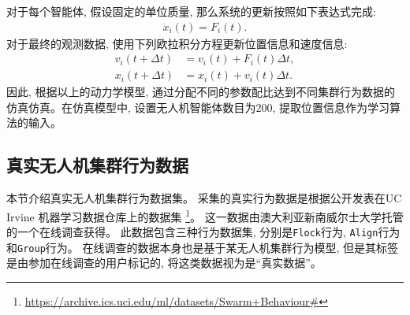 对于每个智能体, 假设固定的单位质量, 那么系统的更新按照如下表达式完成:
\begin{align}
\ddot{x}_{i}(t) = F_{i}(t).
\end{align}
对于最终的观测数据, 使用下列欧拉积分方程更新位置信息和速度信息:
\begin{align}
v_{i}(t + \Delta t) &= v_{i}(t) + F_{i}(t)\Delta t,\\
x_{i}(t + \Delta t) &= x_{i}(t) + v_{i}(t)\Delta t.  
\end{align}
因此, 根据以上的动力学模型, 通过分配不同的参数配比达到不同集群行为数据的仿真仿真。在仿真模型中, 设置无人机智能体数目为200, 提取位置信息作为学习算法的输入。 

\subsection{真实无人机集群行为数据}
\label{sec:truth-swarm}
本节介绍真实无人机集群行为数据集。 采集的真实行为数据是根据公开发表在UC Irvine 机器学习数据仓库上的数据集 \footnote{\url{https://archive.ics.uci.edu/ml/datasets/Swarm+Behaviour\#}}。 这一数据由澳大利亚新南威尔士大学托管的一个在线调查获得。 此数据包含三种行为数据集, 分别是\texttt{Flock}行为, \texttt{Align}行为和\texttt{Group}行为。 在线调查的数据本身也是基于某无人机集群行为模型, 但是其标签是由参加在线调查的用户标记的, 将这类数据视为是“真实数据”。

